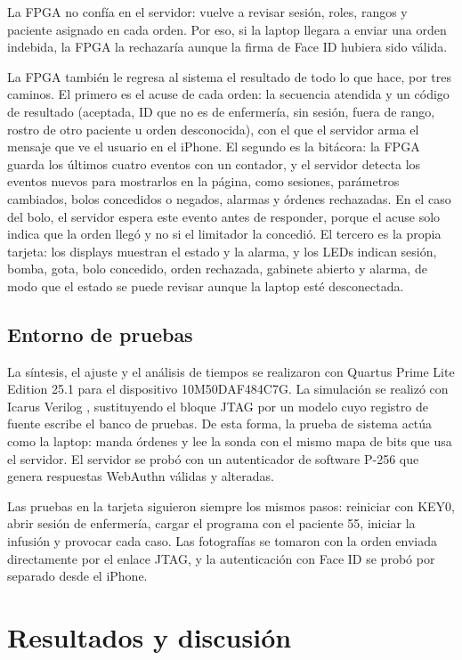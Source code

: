 \documentclass[11pt,letterpaper]{article}
\begin{document}
La FPGA no confía en el servidor: vuelve a revisar sesión, roles, rangos y paciente asignado en cada orden. Por eso, si la laptop llegara a enviar una orden indebida, la FPGA la rechazaría aunque la firma de Face ID hubiera sido válida.

La FPGA también le regresa al sistema el resultado de todo lo que hace, por tres caminos. El primero es el acuse de cada orden: la secuencia atendida y un código de resultado (aceptada, ID que no es de enfermería, sin sesión, fuera de rango, rostro de otro paciente u orden desconocida), con el que el servidor arma el mensaje que ve el usuario en el iPhone. El segundo es la bitácora: la FPGA guarda los últimos cuatro eventos con un contador, y el servidor detecta los eventos nuevos para mostrarlos en la página, como sesiones, parámetros cambiados, bolos concedidos o negados, alarmas y órdenes rechazadas. En el caso del bolo, el servidor espera este evento antes de responder, porque el acuse solo indica que la orden llegó y no si el limitador la concedió. El tercero es la propia tarjeta: los displays muestran el estado y la alarma, y los LEDs indican sesión, bomba, gota, bolo concedido, orden rechazada, gabinete abierto y alarma, de modo que el estado se puede revisar aunque la laptop esté desconectada.

\subsection{Entorno de pruebas}
La síntesis, el ajuste y el análisis de tiempos se realizaron con Quartus Prime Lite Edition 25.1 para el dispositivo 10M50DAF484C7G. La simulación se realizó con Icarus Verilog \cite{iverilog}, sustituyendo el bloque JTAG por un modelo cuyo registro de fuente escribe el banco de pruebas. De esta forma, la prueba de sistema actúa como la laptop: manda órdenes y lee la sonda con el mismo mapa de bits que usa el servidor. El servidor se probó con un autenticador de software P-256 que genera respuestas WebAuthn válidas y alteradas.

Las pruebas en la tarjeta siguieron siempre los mismos pasos: reiniciar con KEY0, abrir sesión de enfermería, cargar el programa con el paciente 55, iniciar la infusión y provocar cada caso. Las fotografías se tomaron con la orden enviada directamente por el enlace JTAG, y la autenticación con Face ID se probó por separado desde el iPhone.

\section{Resultados y discusión}\label{sec:resultados}
\end{document}
